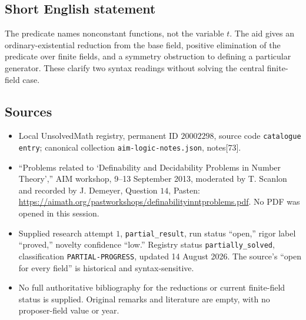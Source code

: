 \documentclass[11pt]{article}
\begin{document}
\subsection{Short English statement}
The predicate names nonconstant functions, not the variable \(t\). The aid gives an ordinary-existential reduction from the base field, positive elimination of the predicate over finite fields, and a symmetry obstruction to defining a particular generator. These clarify two syntax readings without solving the central finite-field case.
\subsection{Sources}
\begin{itemize}
\item Local UnsolvedMath registry, permanent ID \(20002298\), source code \texttt{catalogue entry}; canonical collection \texttt{aim-logic-notes.json}, notes[73].
\item ``Problems related to `Definability and Decidability Problems in Number Theory','' AIM workshop, 9--13 September 2013, moderated by T. Scanlon and recorded by J. Demeyer, Question \(14\), Pasten: \url{https://aimath.org/pastworkshops/definabilityinntproblems.pdf}. No PDF was opened in this session.
\item Supplied research attempt \(1\), \texttt{partial\_result}, run status ``open,'' rigor label ``proved,'' novelty confidence ``low.'' Registry status \texttt{partially\_solved}, classification \texttt{PARTIAL-PROGRESS}, updated 14 August 2026. The source's ``open for every field'' is historical and syntax-sensitive.
\item No full authoritative bibliography for the reductions or current finite-field status is supplied. Original remarks and literature are empty, with no proposer-field value or year.
\end{itemize}
\end{document}
